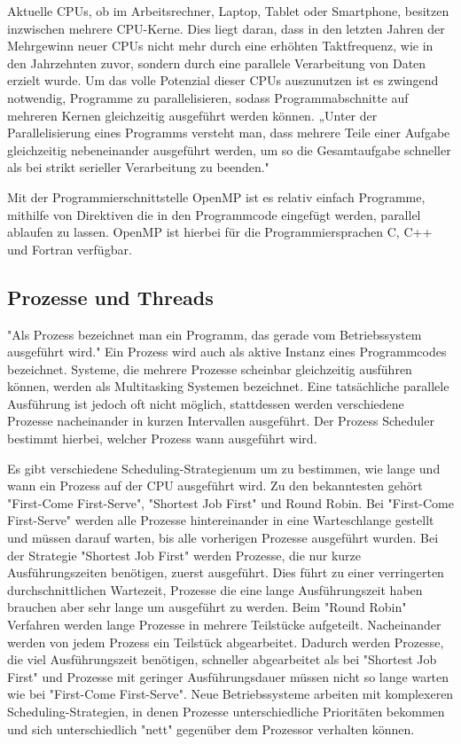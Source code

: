 \documentclass[../main.tex]{subfiles}
\begin{document}
Aktuelle CPUs, ob im Arbeitsrechner, Laptop, Tablet oder Smartphone, besitzen inzwischen mehrere CPU-Kerne. Dies liegt daran, dass in den letzten Jahren der Mehrgewinn neuer CPUs nicht mehr durch eine erhöhten Taktfrequenz, wie in den Jahrzehnten zuvor, sondern durch eine parallele Verarbeitung von Daten erzielt wurde. Um das volle Potenzial dieser CPUs auszunutzen ist es zwingend notwendig, Programme zu parallelisieren, sodass Programmabschnitte auf mehreren Kernen gleichzeitig ausgeführt werden können.
„Unter der Parallelisierung eines Programms versteht man, dass mehrere Teile einer Aufgabe gleichzeitig nebeneinander ausgeführt werden, um so die Gesamtaufgabe schneller als bei strikt serieller Verarbeitung zu beenden." \cite{articleOpenMP}

Mit der Programmierschnittstelle OpenMP ist es relativ einfach Programme, mithilfe von Direktiven die in den Programmcode eingefügt werden, parallel ablaufen zu lassen. OpenMP ist hierbei für die Programmiersprachen C, C++ und Fortran verfügbar.

\subsection{Prozesse und Threads}

"Als Prozess bezeichnet man ein Programm, das gerade vom Betriebssystem ausgeführt wird." \cite{articleOpenMP} Ein Prozess wird auch als aktive Instanz eines Programmcodes bezeichnet. Systeme, die mehrere Prozesse scheinbar gleichzeitig ausführen können, werden als Multitasking Systemen bezeichnet. Eine tatsächliche parallele Ausführung ist jedoch oft nicht möglich, stattdessen werden verschiedene Prozesse nacheinander in kurzen Intervallen ausgeführt. Der Prozess Scheduler bestimmt hierbei, welcher Prozess wann ausgeführt wird. \par
Es gibt verschiedene Scheduling-Strategienum um zu bestimmen, wie lange und wann ein Prozess auf der CPU ausgeführt wird. Zu den bekanntesten gehört "First-Come First-Serve", "Shortest Job First" und Round Robin. Bei "First-Come First-Serve" werden alle Prozesse hintereinander in eine Warteschlange gestellt und müssen darauf warten, bis alle vorherigen Prozesse ausgeführt wurden.  Bei der Strategie "Shortest Job First" werden Prozesse, die nur kurze Ausführungszeiten benötigen, zuerst ausgeführt. Dies führt zu einer verringerten durchschnittlichen Wartezeit, Prozesse die eine lange Ausführungszeit haben brauchen aber sehr lange um ausgeführt zu werden.
Beim "Round Robin" Verfahren werden lange Prozesse in mehrere Teilstücke aufgeteilt. Nacheinander werden von jedem Prozess ein Teilstück abgearbeitet. Dadurch werden Prozesse, die viel Ausführungszeit benötigen, schneller abgearbeitet als bei "Shortest Job First" und Prozesse mit geringer Ausführungsdauer müssen nicht so lange warten wie bei "First-Come First-Serve". 
Neue Betriebssysteme arbeiten mit komplexeren Scheduling-Strategien, in denen Prozesse unterschiedliche Prioritäten bekommen und sich unterschiedlich "nett" gegenüber dem Prozessor verhalten können. \cite{scriptProzessScheduling}
\end{document}
